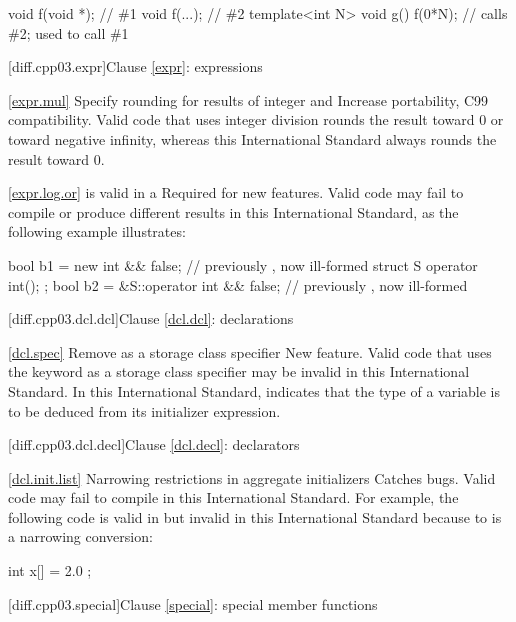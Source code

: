 \begin{codeblock}
void f(void *);  // \#1
void f(...);     // \#2
template<int N> void g() {
  f(0*N);        // calls \#2; used to call \#1
}
\end{codeblock}

[diff.cpp03.expr]{Clause \ref{expr}: expressions}

\ref{expr.mul}
\change Specify rounding for results of integer \tcode{/} and \tcode{\%}
\rationale Increase portability, C99 compatibility.
\effect
Valid \CppIII code that uses integer division rounds the result toward 0 or
toward negative infinity, whereas this International Standard always rounds
the result toward 0.

\ref{expr.log.or}
\change \tcode{\&\&} is valid in a 
\rationale Required for new features.
\effect 
Valid \CppIII code may fail to compile or produce different results in
this International Standard, as the following example illustrates:

\begin{codeblock}
bool b1 = new int && false;           // previously , now ill-formed
struct S { operator int(); };
bool b2 = &S::operator int && false;  // previously , now ill-formed
\end{codeblock}

[diff.cpp03.dcl.dcl]{Clause \ref{dcl.dcl}: declarations}

\ref{dcl.spec}
\change Remove  as a storage class specifier
\rationale New feature.
\effect
Valid \CppIII code that uses the keyword  as a storage class
specifier may be invalid in this International Standard. In this International
Standard,  indicates that the type of a variable is to be deduced
from its initializer expression.

[diff.cpp03.dcl.decl]{Clause \ref{dcl.decl}: declarators}

\ref{dcl.init.list}
\change Narrowing restrictions in aggregate initializers
\rationale Catches bugs.
\effect
Valid \CppIII code may fail to compile in this International Standard. For
example, the following code is valid in \CppIII but invalid in this
International Standard because  to  is a narrowing
conversion:

\begin{codeblock}
int x[] = { 2.0 };
\end{codeblock}

[diff.cpp03.special]{Clause \ref{special}: special member functions}

